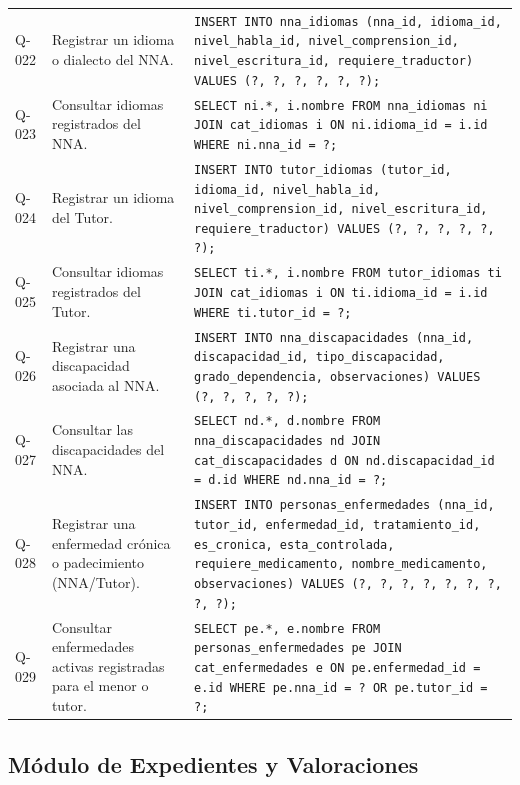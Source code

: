 \begin{table}[H]
\begin{tabular}{l p{4.5cm} p{8.5cm}}
		\addlinespace
		Q-022 & Registrar un idioma o dialecto del NNA. & 
		\texttt{INSERT INTO nna\_idiomas (nna\_id, idioma\_id, nivel\_habla\_id, nivel\_comprension\_id, nivel\_escritura\_id, requiere\_traductor) VALUES (?, ?, ?, ?, ?, ?);} \\
		\addlinespace
		Q-023 & Consultar idiomas registrados del NNA. & 
		\texttt{SELECT ni.*, i.nombre FROM nna\_idiomas ni JOIN cat\_idiomas i ON ni.idioma\_id = i.id WHERE ni.nna\_id = ?;} \\
		\addlinespace
		Q-024 & Registrar un idioma del Tutor. & 
		\texttt{INSERT INTO tutor\_idiomas (tutor\_id, idioma\_id, nivel\_habla\_id, nivel\_comprension\_id, nivel\_escritura\_id, requiere\_traductor) VALUES (?, ?, ?, ?, ?, ?);} \\
		\addlinespace
		Q-025 & Consultar idiomas registrados del Tutor. & 
		\texttt{SELECT ti.*, i.nombre FROM tutor\_idiomas ti JOIN cat\_idiomas i ON ti.idioma\_id = i.id WHERE ti.tutor\_id = ?;} \\
		\addlinespace
		Q-026 & Registrar una discapacidad asociada al NNA. & 
		\texttt{INSERT INTO nna\_discapacidades (nna\_id, discapacidad\_id, tipo\_discapacidad, grado\_dependencia, observaciones) VALUES (?, ?, ?, ?, ?);} \\
		\addlinespace
		Q-027 & Consultar las discapacidades del NNA. & 
		\texttt{SELECT nd.*, d.nombre FROM nna\_discapacidades nd JOIN cat\_discapacidades d ON nd.discapacidad\_id = d.id WHERE nd.nna\_id = ?;} \\
		\addlinespace
		Q-028 & Registrar una enfermedad crónica o padecimiento (NNA/Tutor). & 
		\texttt{INSERT INTO personas\_enfermedades (nna\_id, tutor\_id, enfermedad\_id, tratamiento\_id, es\_cronica, esta\_controlada, requiere\_medicamento, nombre\_medicamento, observaciones) VALUES (?, ?, ?, ?, ?, ?, ?, ?, ?);} \\
		\addlinespace
		Q-029 & Consultar enfermedades activas registradas para el menor o tutor. & 
		\texttt{SELECT pe.*, e.nombre FROM personas\_enfermedades pe JOIN cat\_enfermedades e ON pe.enfermedad\_id = e.id WHERE pe.nna\_id = ? OR pe.tutor\_id = ?;} \\
		\bottomrule
	\end{tabular}
\end{table}

\subsection{Módulo de Expedientes y Valoraciones}

